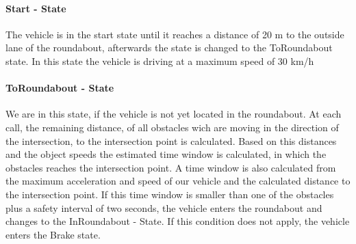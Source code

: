 \documentclass[11pt,oneside,openright]{mpreport}
\begin{document}
\paragraph{Start - State}

The vehicle is in the start state until it reaches a distance of 20 m to the outside lane of the roundabout, afterwards the state is changed to the ToRoundabout state.
In this state the vehicle is driving at a maximum speed of 30 km/h


\paragraph{ToRoundabout - State}
We are in this state, if the vehicle is not yet located in the roundabout. At each call, the remaining distance,
of all obstacles wich are moving in the direction of the intersection, to the intersection point is calculated. 
Based on this distances and the object speeds the estimated time window is calculated, in which the obstacles reaches the intersection point.
A time window is also calculated from the maximum acceleration and speed of our vehicle and the calculated distance to the intersection point.
If this time window is smaller than one of the obstacles plus a safety interval of two seconds, the vehicle enters the roundabout and changes to the InRoundabout - State.
If this condition does not apply, the vehicle enters the Brake state.
\end{document}
